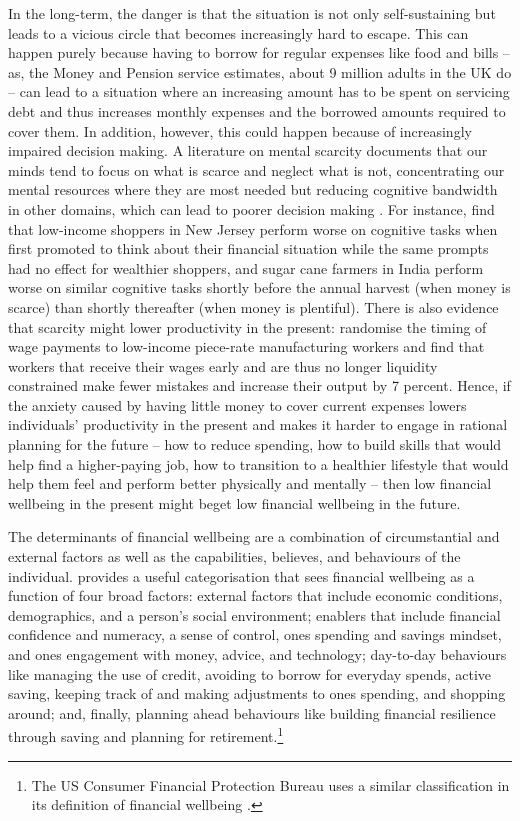In the long-term, the danger is that the situation is not only self-sustaining
but leads to a vicious circle that becomes increasingly hard to escape. This
can happen purely because having to borrow for regular expenses like food and
bills -- as, the Money and Pension service estimates, about 9 million adults in
the UK do \citep{mps2018building} -- can lead to a situation where an
increasing amount has to be spent on servicing debt and thus increases monthly
expenses and the borrowed amounts required to cover them. In addition, however,
this could happen because of increasingly impaired decision making. A
literature on mental scarcity documents that our minds tend to focus on what is
scarce and neglect what is not, concentrating our mental resources where they
are most needed but reducing cognitive bandwidth in other domains, which can
lead to poorer decision making \citep{shah2012some, mullainathan2013scarcity,
haushofer2014psychology}. For instance, \citet{mani2013poverty} find that
low-income shoppers in New Jersey perform worse on cognitive tasks when first
promoted to think about their financial situation while the same prompts had no
effect for wealthier shoppers, and sugar cane farmers in India perform worse on
similar cognitive tasks shortly before the annual harvest (when money is
scarce) than shortly thereafter (when money is plentiful). There is also
evidence that scarcity might lower productivity in the present:
\citet{kaur2021financial} randomise the timing of wage payments to low-income
piece-rate manufacturing workers and find that workers that receive their wages
early and are thus no longer liquidity constrained make fewer mistakes and
increase their output by 7 percent. Hence, if the anxiety caused by having
little money to cover current expenses lowers individuals' productivity in the
present and makes it harder to engage in rational planning for the future --
how to reduce spending, how to build skills that would help find a
higher-paying job, how to transition to a healthier lifestyle that would help
them feel and perform better physically and mentally -- then low financial
wellbeing in the present might beget low financial wellbeing in the future.

The determinants of financial wellbeing are a combination of circumstantial and
external factors as well as the capabilities, believes, and behaviours of the
individual. \citet{mps2018building} provides a useful categorisation that sees
financial wellbeing as a function of four broad factors: external factors that
include economic conditions, demographics, and a person's social environment;
enablers that include financial confidence and numeracy, a sense of control,
ones spending and savings mindset, and ones engagement with money, advice, and
technology; day-to-day behaviours like managing the use of credit, avoiding to
borrow for everyday spends, active saving, keeping track of and making
adjustments to ones spending, and shopping around; and, finally, planning ahead
behaviours like building financial resilience through saving and planning for
retirement.\footnote{The US Consumer Financial Protection Bureau uses a similar
    classification in its definition of financial wellbeing
\citep{cfpb2015financial}.}

